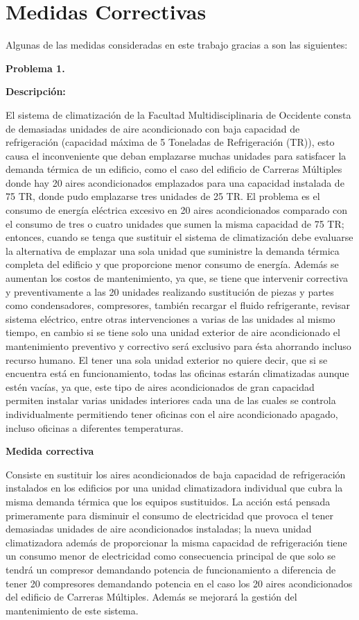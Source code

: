 \documentclass[12pt,letterpaper]{report}
\begin{document}
\section*{Medidas Correctivas}


Algunas de las medidas consideradas en este trabajo gracias a \cite{ANelson} son las siguientes:

\textbf{Problema 1.}

\textbf{Descripción:}

El sistema de climatización de la Facultad Multidisciplinaria de Occidente consta de demasiadas unidades de aire acondicionado con baja capacidad de refrigeración (capacidad máxima de 5 Toneladas de Refrigeración (TR)), esto causa el inconveniente que deban emplazarse muchas unidades para satisfacer la demanda térmica de un edificio, como el caso del edificio de Carreras Múltiples donde hay 20 aires acondicionados emplazados para una capacidad instalada de 75 TR, donde pudo emplazarse tres unidades de 25 TR. El problema es el consumo de energía eléctrica excesivo en 20 aires acondicionados comparado con el consumo de tres o cuatro unidades que sumen la misma capacidad de 75 TR; entonces, cuando se tenga que sustituir el sistema de climatización debe evaluarse la alternativa de emplazar una sola unidad que suministre la demanda térmica completa del edificio y que proporcione menor consumo de energía.
Además se aumentan los costos de mantenimiento, ya que, se tiene que intervenir correctiva y preventivamente a las 20 unidades realizando sustitución de piezas y partes como condensadores, compresores, también recargar el fluido refrigerante, revisar sistema eléctrico, entre otras intervenciones a varias de las unidades al mismo tiempo, en cambio si se tiene solo una unidad exterior de aire acondicionado el mantenimiento preventivo y correctivo será exclusivo para ésta ahorrando incluso recurso humano.
El tener una sola unidad exterior no quiere decir, que si se encuentra está en funcionamiento, todas las oficinas estarán climatizadas aunque estén vacías, ya que, este tipo de aires acondicionados de gran capacidad permiten instalar varias unidades interiores cada una de las cuales se controla individualmente permitiendo tener oficinas con el aire acondicionado apagado, incluso oficinas a diferentes temperaturas.

\textbf{Medida correctiva}

Consiste en sustituir los aires acondicionados de baja capacidad de refrigeración instalados en los edificios por una unidad climatizadora individual que cubra la misma demanda térmica que los equipos sustituidos. La acción está pensada primeramente para disminuir el consumo de electricidad que provoca el tener demasiadas unidades de aire acondicionados instaladas; la nueva unidad climatizadora además de proporcionar la misma capacidad de refrigeración tiene un consumo menor de electricidad como consecuencia principal de que solo se tendrá un compresor demandando potencia de funcionamiento a diferencia de tener 20 compresores demandando potencia en el caso los 20 aires acondicionados del edificio de Carreras Múltiples. Además se mejorará la gestión del mantenimiento de este sistema.
\end{document}
